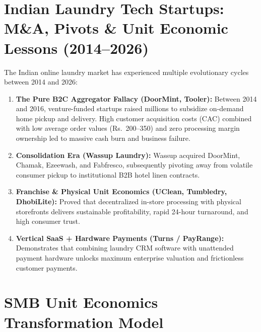 \documentclass[11pt,a4paper]{article}
\begin{document}
\newpage
\section{Indian Laundry Tech Startups: M\&A, Pivots \& Unit Economic Lessons (2014--2026)}

The Indian online laundry market has experienced multiple evolutionary cycles between 2014 and 2026:

\begin{enumerate}[leftmargin=*]
    \item \textbf{The Pure B2C Aggregator Fallacy (DoorMint, Tooler):} Between 2014 and 2016, venture-funded startups raised millions to subsidize on-demand home pickup and delivery. High customer acquisition costs (CAC) combined with low average order values (Rs.~200--350) and zero processing margin ownership led to massive cash burn and business failure.
    \item \textbf{Consolidation Era (Wassup Laundry):} Wassup acquired DoorMint, Chamak, Ezeewash, and Fabfresco, subsequently pivoting away from volatile consumer pickup to institutional B2B hotel linen contracts.
    \item \textbf{Franchise \& Physical Unit Economics (UClean, Tumbledry, DhobiLite):} Proved that decentralized in-store processing with physical storefronts delivers sustainable profitability, rapid 24-hour turnaround, and high consumer trust.
    \item \textbf{Vertical SaaS + Hardware Payments (Turns / PayRange):} Demonstrates that combining laundry CRM software with unattended payment hardware unlocks maximum enterprise valuation and frictionless customer payments.
\end{enumerate}

\newpage
\section{SMB Unit Economics Transformation Model}
\end{document}
